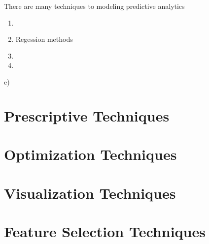 There are many techniques to modeling predictive analytics 
\FloatBarrier

\begin{enumerate}
	\item 
	\item Regession methods
	\item 
	\item 
\end{enumerate}e)

%
%
%
%


\setlength{\footskip}{8mm}

\chapter{Prescriptive Techniques} 
\label{prescriptive-techniques}


\FloatBarrier


%
%
%
%

\setlength{\footskip}{8mm}

\chapter{Optimization Techniques} 
\label{optimization-techniques}


\FloatBarrier


%
%
%
%

\setlength{\footskip}{8mm}

\chapter{Visualization Techniques} 
\label{visualization-techniques}


\FloatBarrier


%
%
%
%

\setlength{\footskip}{8mm}

\chapter{Feature Selection Techniques} 
\label{feature-selection-techniques}


\FloatBarrier

